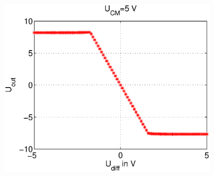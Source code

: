 \begin{frame}
\begin{columns}[c]
    \begin{figure}[H]
    \begin{center}
            \includegraphics[scale=0.3]{./img/plots/Auf_3_Ucm_5.eps}
    \end{center}
    \end{figure}
    
    \end{columns}
\end{frame}
